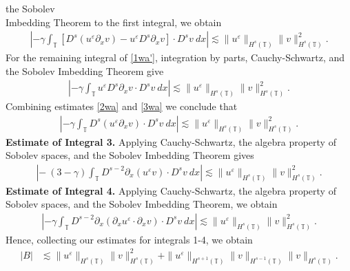 \documentclass[12pt,reqno]{amsart}
\newcommand{\p}{\partial}
\newcommand{\ci}{\mathbb{T}}
\newcommand{\ee}{\varepsilon}
\theoremstyle{plain}  %
\theoremstyle{definition}
\begin{document}
the Sobolev \\ Imbedding Theorem to 
the first integral, we obtain
%
%
%
%
\begin{equation}
\begin{split}
| -\gamma \int_\ci \left[ D^s(u^\ee \p_x v) - u^\ee D^s
\p_x v \right] \cdot D^s v \ dx |
\lesssim \|u^\ee \|_{H^s(\ci)} \|v\|_{H^s(\ci)}^2.
\label{2wa}
\end{split}
\end{equation}
%
%
For the remaining integral of \eqref{1wa'}, integration by parts, 
Cauchy-Schwartz, and the Sobolev Imbedding Theorem give
%
%
\begin{equation}
\begin{split}
| - \gamma \int_\ci u^\ee D^s \p_x v \cdot D^s v \ dx |
\lesssim \|u^\ee \|_{H^s(\ci)} \|v\|_{H^s(\ci)}^2.
\label{3wa}
\end{split}
\end{equation}
%
%
Combining estimates \eqref{2wa} and \eqref{3wa} we conclude that
%
%
\begin{equation}
\begin{split}
\left | -\gamma \int_\ci D^s (u^\ee \p_x v) \cdot D^s v \
dx \right |
 \lesssim \|u^\ee \|_{H^s(\ci)} \|v\|_{H^s(\ci)}^2.
\label{4wa}
\end{split}
\end{equation}
%
%
{\bf Estimate of Integral 3.} Applying Cauchy-Schwartz, the 
algebra property of Sobolev spaces, and the Sobolev Imbedding Theorem gives
%
%
\begin{equation}
\begin{split}
\left |- \ ( 3- \gamma) \int_\ci D^{s-2} \p_x (u^\ee v) \cdot D^s
v \ dx \right |  \lesssim \|u^\ee\|_{H^{s}(\ci)} \|v\|_{H^{s}(\ci)}^2.
\label{13u}
\end{split}
\end{equation}
%
%
%
%
%
%
{\bf Estimate of Integral 4.} Applying Cauchy-Schwartz, the 
algebra property of Sobolev spaces, and the Sobolev Imbedding Theorem, we 
obtain
%
%
\begin{equation*}
\begin{split}
\left |-\gamma \int_\ci D^{s-2} \p_x
(\p_x u^\ee \cdot \p_x v) \cdot D^s v \
dx \right |
 \lesssim \|u^\ee\|_{H^s(\ci)} \|v\|_{H^s(\ci)}^2.
\end{split}
\end{equation*}
%
%
Hence, collecting our estimates for integrals 1-4, we obtain 
%
%
\begin{equation}
\begin{split}
|B| & \lesssim
\|u^\ee\|_{H^s(\ci)}
\|v\|_{H^s(\ci)}^2 + \|u^\ee\|_{H^{s+1}(\ci)}
\|v\|_{H^{s-1}(\ci)} \|v\|_{H^s(\ci)}.
\label{14u}
\end{split}
\end{equation}
\end{document}
